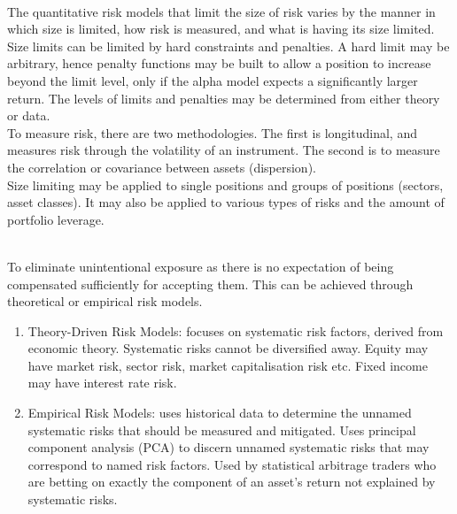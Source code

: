 \begin{method} \\
The quantitative risk models that limit the size of risk varies by the manner in which size is limited, how risk is measured, and what is having its size limited.\\
Size limits can be limited by hard constraints and penalties. A hard limit may be arbitrary, hence penalty functions may be built to allow a position to increase beyond the limit level, only if the alpha model expects a significantly larger return. The levels of limits and penalties may be determined from either theory or data.\\
To measure risk, there are two methodologies. The first is longitudinal, and measures risk through the volatility of an instrument. The second is to measure the correlation or covariance between assets (dispersion).\\
Size limiting may be applied to single positions and groups of positions (sectors, asset classes). It may also be applied to various types of risks and the amount of portfolio leverage.
\end{method}

\begin{method} \\
To eliminate unintentional exposure as there is no expectation of being compensated sufficiently for accepting them. This can be achieved through theoretical or empirical risk models.
\begin{enumerate}[label=\roman*.]
\setlength{\itemsep}{0pt}
\item Theory-Driven Risk Models: focuses on systematic risk factors, derived from economic theory. Systematic risks cannot be diversified away. Equity may have market risk, sector risk, market capitalisation risk etc. Fixed income may have interest rate risk.
\item Empirical Risk Models: uses historical data to determine the unnamed systematic risks that should be measured and mitigated. Uses principal component analysis (PCA) to discern unnamed systematic risks that may correspond to named risk factors. Used by statistical arbitrage traders who are betting on exactly the component of an asset's return not explained by systematic risks.
\end{enumerate}
\end{method}
